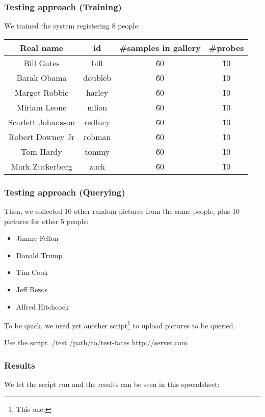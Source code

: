 \begin{frame} \frametitle{Testing approach (Training)}

	We trained the system registering 8 people:
	
	\begin{center}
 		\begin{tabular}{||c | c | c | c||} 
			 \hline
			 	\textbf{Real name} & 
			 	\textbf{id} & 
			 	\textbf{\#samples in gallery} & 
			 	\textbf{\#probes} 
			 \\ [0.5ex] 
			 \hline\hline
			 	Bill Gates & 
			 	bill & 
			 	\~60 & 
			 	\~10 
			 \\ 
			 \hline
			 	Barak Obama & 
			 	doubleb & 
			 	\~60 & 
			 	\~10 
			 \\
			 \hline
			 	Margot Robbie & 
				harley & 
			 	\~60 & 
			 	\~10 
			 \\
			 \hline
			 	Miriam Leone & 
			 	mlion & 
			 	\~60 & 
			 	\~10 
			 \\
			 \hline
			 	Scarlett Johansson & 
			 	redlucy & 
			 	\~60 & 
			 	\~10 
			\\
			 \hline
			 	Robert Downey Jr & 
				robman & 
			 	\~60 & 
			 	\~10 
			 \\
			 \hline
			 	Tom Hardy & 
			 	tommy & 
			 	\~60 & 
			 	\~10
			\\
			 \hline
			 	Mark Zuckerberg & 
			 	zuck & 
			 	\~60 & 
			 	\~10
			\\ [1ex] 
 			\hline
		\end{tabular}
	\end{center}	

\end{frame}

\begin{frame} \frametitle{Testing approach (Querying)}
	
	Then, we collected 10 other random pictures from the same 
	people, plus 10 pictures for other 5 people:
	
	\begin{itemize}
		\item Jimmy Fellon
		\item Donald Trump
		\item Tim Cook
		\item Jeff Bezos
		\item Alfred Hitchcock
	\end{itemize}
	
	To be quick, we used yet another script\footnote{This one: } to upload
	pictures to be queried. 
	
	\begin{block}{Use the script}
		./test /path/to/test-faces http://server.com
	\end{block}

\end{frame}

\begin{frame} \frametitle{Results}

	We let the script run and the results can be seen in this spreadsheet:
	
	\begin{center}
		{ \color{red} \url{} }
	\end{center}

\end{frame}
